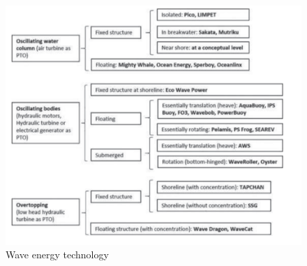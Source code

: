 \documentclass[10pt,a4paper,oneside]{article}
\begin{document}
\begin{figure}
\label{Technologies}
	\includegraphics[scale=0.6]{Technologies.png}
	\caption{Wave energy technology}
\end{figure}
\end{document}
